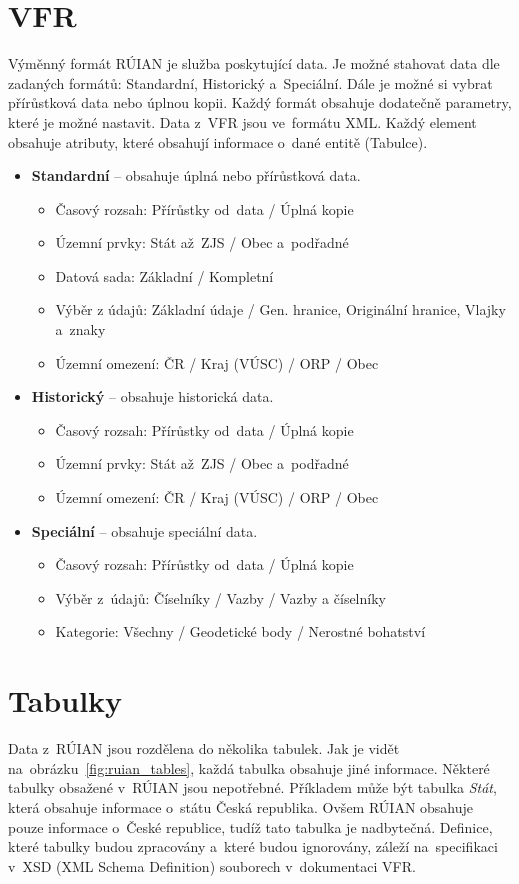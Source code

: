 \documentclass[czech, kiv, ba, he, iso690auyr, pdf]{fasthesis}
\begin{document}
\section{VFR}
Výměnný formát RÚIAN je služba poskytující data.
Je možné stahovat data dle zadaných formátů: Standardní, Historický a~Speciální.
Dále je možné si vybrat přírůstková data nebo úplnou kopii.
Každý formát obsahuje dodatečně parametry, které je možné nastavit.
Data z~VFR jsou ve~formátu XML.
Každý element obsahuje atributy, které obsahují informace o~dané entitě (Tabulce).
\newpage
\begin {itemize}
    \item \textbf{Standardní} -- obsahuje úplná nebo přírůstková data.
    \begin {itemize}
        \item Časový rozsah: Přírůstky od~data / Úplná kopie
        \item Územní prvky: Stát až~ZJS / Obec a~podřadné
        \item Datová sada: Základní / Kompletní
        \item Výběr z údajů: Základní údaje / Gen. hranice, Originální hranice, Vlajky a~znaky
        \item Územní omezení: ČR / Kraj (VÚSC) / ORP / Obec
    \end {itemize}
    \item \textbf{Historický} -- obsahuje historická data.
    \begin {itemize}
        \item Časový rozsah: Přírůstky od~data / Úplná kopie
        \item Územní prvky: Stát až~ZJS / Obec a~podřadné
        \item Územní omezení: ČR / Kraj (VÚSC) / ORP / Obec
    \end {itemize}
    \item \textbf{Speciální} -- obsahuje speciální data.
    \begin {itemize}
        \item Časový rozsah: Přírůstky od~data / Úplná kopie
        \item Výběr z~údajů: Číselníky / Vazby / Vazby a číselníky
        \item Kategorie: Všechny / Geodetické body / Nerostné bohatství
    \end {itemize}
\end {itemize}

\section{Tabulky}
Data z~RÚIAN jsou rozdělena do několika tabulek.
Jak je vidět na~obrázku~\ref{fig:ruian_tables}, každá tabulka obsahuje jiné informace.
Některé tabulky obsažené v~RÚIAN jsou nepotřebné. 
Příkladem může být tabulka \textit{Stát}, která obsahuje informace o~státu Česká republika.
Ovšem RÚIAN obsahuje pouze informace o~České republice, tudíž tato tabulka je nadbytečná.
Definice, které tabulky budou zpracovány a~které budou ignorovány, záleží na~specifikaci 
v~XSD (XML Schema Definition) souborech v~dokumentaci VFR. 
\newpage
\end{document}
